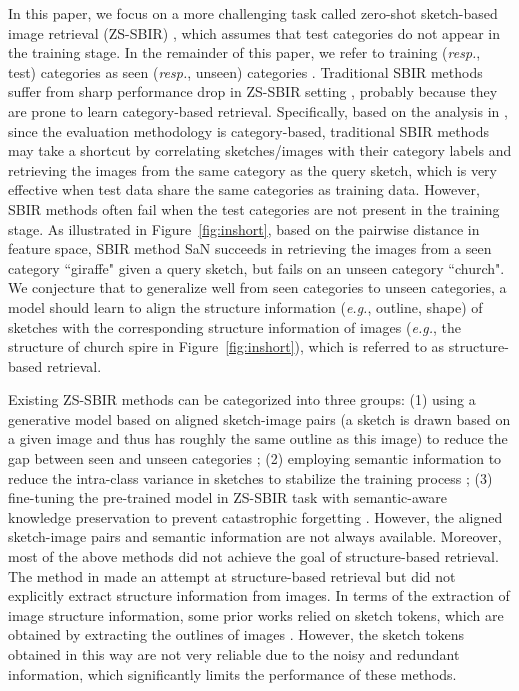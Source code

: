 \documentclass[10pt,twocolumn,letterpaper]{article}
\begin{document}
In this paper, we focus on a more challenging task called zero-shot sketch-based image retrieval (ZS-SBIR) \cite{shen2018zero}, which assumes that test categories do not appear in the training stage. In the remainder of this paper, we refer to training  (\emph{resp.}, test) categories as seen (\emph{resp.}, unseen) categories \cite{dupont2018learning}.
Traditional SBIR methods suffer from sharp performance drop in ZS-SBIR setting \cite{yelamarthi2018zero}, probably because they are prone to learn category-based retrieval.
Specifically, based on the analysis in \cite{yelamarthi2018zero}, since the evaluation methodology is category-based, traditional SBIR methods may take a shortcut by correlating sketches/images with their category labels and retrieving the images from the same category as the query sketch, which is very effective when test data share the same categories as training data. 
However, SBIR methods often fail when the test categories are not present in the training stage. 
As illustrated in Figure~\ref{fig:inshort}, based on the pairwise distance in feature space, SBIR method SaN \cite{yu2017sketch} succeeds in retrieving the images from a seen category ``giraffe" given a query sketch, but fails on an unseen category ``church". We conjecture that to generalize well from seen categories to unseen categories, a model should learn to align the structure information (\emph{e.g.}, outline, shape) of sketches with the corresponding structure information of images (\emph{e.g.}, the structure of church spire in Figure~\ref{fig:inshort}), which is referred to as structure-based retrieval. 

Existing ZS-SBIR methods can be categorized into three groups:
(1) using a generative model based on aligned sketch-image pairs (a sketch is drawn based on a given image and thus has roughly the same outline as this image) to reduce the gap between seen and unseen categories \cite{yelamarthi2018zero}; 
(2) employing semantic information to reduce the intra-class variance in sketches to stabilize the training process \cite{xu2019semantic, wang2019stacked, dutta2019semantically, shen2018zero}; 
(3) fine-tuning the pre-trained model in ZS-SBIR task with semantic-aware knowledge preservation to prevent catastrophic forgetting \cite{liu2019semantic}. 
However, the aligned sketch-image pairs and semantic information are not always available. Moreover, most of the above methods did not achieve the goal of structure-based retrieval. The method in \cite{yelamarthi2018zero} made an attempt at structure-based retrieval but did not explicitly extract structure information from images. 
In terms of the extraction of image structure information, some prior works relied on sketch tokens, which are obtained by extracting the outlines of images \cite{liu2017deep, wang2015sketch, yu2016sketch}. However, the sketch tokens obtained in this way are not very reliable due to the noisy and redundant information, which significantly limits the performance of these methods.
\end{document}
